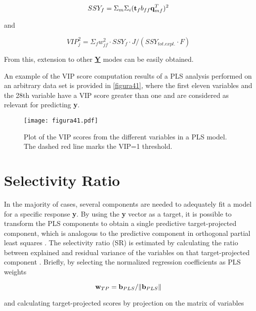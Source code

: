 \begin{equation}
SSY_{f}=\Sigma_m\Sigma_i(\textbf{\text{t}}_fb_{ff}\textbf{\text{q}}^T_{mf})^2
\label{equation28}
\end{equation}

and

\begin{equation}
VIP^2_j=\Sigma_fw^2_{jf} \cdot SSY_{f} \cdot J/(SSY_{tot.expl.} \cdot F)
\label{equation29}
\end{equation}

From this, extension to other \textbf{\underline{Y}} modes can be easily obtained.

An example of the VIP score computation results of a PLS analysis performed on an arbitrary data set is provided in \autoref{figura41}, where the first eleven variables and the 28th variable have a VIP score greater than one and are considered as relevant for predicting \textbf{y}.

\begin{figure}[hbtp]
\centering
\texttt{[image: figura41.pdf]}
\caption[Plot of the VIP scores from the different variables in a PLS model]{Plot of the VIP scores from the different variables in a PLS model. The dashed red line marks the VIP=1 threshold.}
\label{figura41}
\end{figure}

\section{Selectivity Ratio}
In the majority of cases, several components are needed to adequately fit a model for a specific response \textbf{y}. By using the \textbf{y} vector as a target, it is possible to transform the PLS components to obtain a single predictive target-projected component, which is analogous to the predictive component in orthogonal partial least squares \parencite{bylesjo2006opls}. The selectivity ratio (SR) is estimated by calculating the ratio between explained and residual variance of the variables on that target-projected component \parencite{rajalahti2009biomarker}. Briefly, by selecting the normalized regression coefficients as PLS weights

\begin{equation}
\textbf{\text{w}}_{TP}=\textbf{\text{b}}_{PLS}/\|\textbf{\text{b}}_{PLS}\|
\label{equation30}
\end{equation}

and calculating target-projected scores by projection on the matrix of variables

